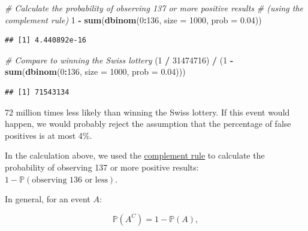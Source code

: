 \documentclass[
]{book}
\newenvironment{Shaded}{\begin{snugshade}}{\end{snugshade}}
\newcommand{\AttributeTok}[1]{\textcolor[rgb]{0.13,0.29,0.53}{#1}}
\newcommand{\CommentTok}[1]{\textcolor[rgb]{0.56,0.35,0.01}{\textit{#1}}}
\newcommand{\DecValTok}[1]{\textcolor[rgb]{0.00,0.00,0.81}{#1}}
\newcommand{\FloatTok}[1]{\textcolor[rgb]{0.00,0.00,0.81}{#1}}
\newcommand{\FunctionTok}[1]{\textcolor[rgb]{0.13,0.29,0.53}{\textbf{#1}}}
\newcommand{\NormalTok}[1]{#1}
\newcommand{\SpecialCharTok}[1]{\textcolor[rgb]{0.81,0.36,0.00}{\textbf{#1}}}
\begin{document}
\begin{Shaded}
\begin{Highlighting}[]
\CommentTok{\# Calculate the probability of observing 137 or more positive results}
\CommentTok{\# (using the complement rule)}
\DecValTok{1} \SpecialCharTok{{-}} \FunctionTok{sum}\NormalTok{(}\FunctionTok{dbinom}\NormalTok{(}\DecValTok{0}\SpecialCharTok{:}\DecValTok{136}\NormalTok{, }\AttributeTok{size =} \DecValTok{1000}\NormalTok{, }\AttributeTok{prob =} \FloatTok{0.04}\NormalTok{))}
\end{Highlighting}
\end{Shaded}

\begin{verbatim}
## [1] 4.440892e-16
\end{verbatim}

\begin{Shaded}
\begin{Highlighting}[]
\CommentTok{\# Compare to winning the Swiss lottery}
\NormalTok{(}\DecValTok{1} \SpecialCharTok{/} \DecValTok{31474716}\NormalTok{) }\SpecialCharTok{/}\NormalTok{ (}\DecValTok{1} \SpecialCharTok{{-}} \FunctionTok{sum}\NormalTok{(}\FunctionTok{dbinom}\NormalTok{(}\DecValTok{0}\SpecialCharTok{:}\DecValTok{136}\NormalTok{, }\AttributeTok{size =} \DecValTok{1000}\NormalTok{, }\AttributeTok{prob =} \FloatTok{0.04}\NormalTok{)))}
\end{Highlighting}
\end{Shaded}

\begin{verbatim}
## [1] 71543134
\end{verbatim}

72 million times less likely than winning the Swiss lottery. If this event would happen,
we would probably reject the assumption that the percentage of false positives is at most 4\%.

In the calculation above, we used the \href{https://en.wikipedia.org/wiki/Complement_(set_theory)}{complement rule} to calculate the probability of
observing 137 or more positive results: \(1 - \mathbb{P}(\text{observing 136 or less})\).

In general, for an event \(A\):

\[\mathbb{P}(A^C) = 1 - \mathbb{P}(A),\]
\end{document}
